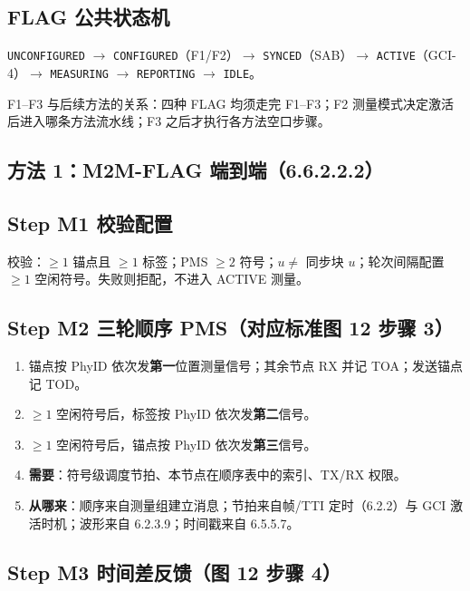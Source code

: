 \documentclass[11pt,a4paper]{ctexart}
\begin{document}
\subsection{FLAG 公共状态机}

\texttt{UNCONFIGURED} $\rightarrow$ \texttt{CONFIGURED}（F1/F2）$\rightarrow$ \texttt{SYNCED}（SAB）$\rightarrow$ \texttt{ACTIVE}（GCI-4）$\rightarrow$ \texttt{MEASURING} $\rightarrow$ \texttt{REPORTING} $\rightarrow$ \texttt{IDLE}。

F1--F3 与后续方法的关系：四种 FLAG 均须走完 F1--F3；F2 测量模式决定激活后进入哪条方法流水线；F3 之后才执行各方法空口步骤。

\subsection{方法 1：M2M-FLAG 端到端（6.6.2.2.2）}

\subsection{Step M1 校验配置}

校验：$\ge 1$ 锚点且 $\ge 1$ 标签；PMS $\ge 2$ 符号；$u\neq$ 同步块 $u$；轮次间隔配置 $\ge 1$ 空闲符号。失败则拒配，不进入 ACTIVE 测量。

\subsection{Step M2 三轮顺序 PMS（对应标准图 12 步骤 3）}

\begin{enumerate}
  \item 锚点按 PhyID 依次发\textbf{第一}位置测量信号；其余节点 RX 并记 TOA；发送锚点记 TOD。
  \item $\ge 1$ 空闲符号后，标签按 PhyID 依次发\textbf{第二}信号。
  \item $\ge 1$ 空闲符号后，锚点按 PhyID 依次发\textbf{第三}信号。
  \item \textbf{需要}：符号级调度节拍、本节点在顺序表中的索引、TX/RX 权限。
  \item \textbf{从哪来}：顺序来自测量组建立消息；节拍来自帧/TTI 定时（6.2.2）与 GCI 激活时机；波形来自 6.2.3.9；时间戳来自 6.5.5.7。
\end{enumerate}

\subsection{Step M3 时间差反馈（图 12 步骤 4）}
\end{document}
